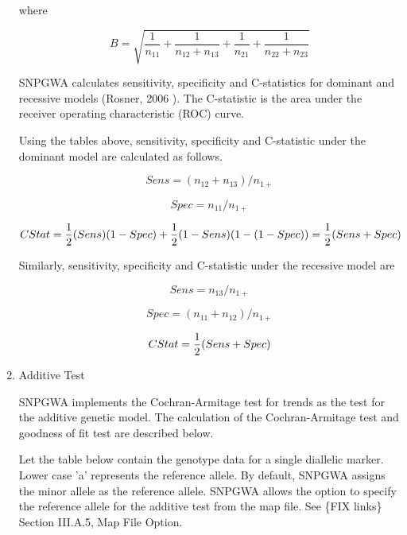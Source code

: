 \begin{enumerate}
where 

\begin{equation*}
  B = \sqrt{\frac{1}{n_{11}} + \frac{1}{n_{12}+n_{13}} + \frac{1}{n_{21}} + \frac{1}{n_{22}+n_{23}}}
\end{equation*}

SNPGWA calculates sensitivity, specificity and C-statistics for dominant and
recessive models (Rosner, 2006 \cite{Rosner06}).  The C-statistic is the area
under the receiver operating characteristic (ROC) curve.

Using the tables above, sensitivity, specificity and C-statistic under the
dominant model are calculated as follows.

\begin{equation*}
  Sens = (n_{12} + n_{13})/n_{1+}
\end{equation*}

\begin{equation*}
  Spec = n_{11}/n_{1+}
\end{equation*}

\begin{equation*}
  C\-Stat = \frac{1}{2}(Sens)(1-Spec) + \frac{1}{2}(1-Sens)(1-(1-Spec))=\frac{1}{2}(Sens+Spec)
\end{equation*}

Similarly, sensitivity, specificity and C-statistic under the recessive model are

\begin{equation*}
  Sens = n_{13}/n_{1+}
\end{equation*}

\begin{equation*}
  Spec = (n_{11} +n_{12})/n_{1+}
\end{equation*}

\begin{equation*}
  C\-Stat = \frac{1}{2}(Sens+Spec)
\end{equation*}

\item{Additive Test}

SNPGWA implements the Cochran-Armitage test for trends as the test for the
additive genetic model.  The calculation of the Cochran-Armitage test and
goodness of fit test are described below.

Let the table below contain the genotype data for a single diallelic marker.
Lower case 'a' represents the reference allele.  By default, SNPGWA assigns the
minor allele as the reference allele.  SNPGWA allows the option to specify the
reference allele for the additive test from the map file.  See \{FIX links\}
Section III.A.5, Map File Option.


\end{enumerate}
